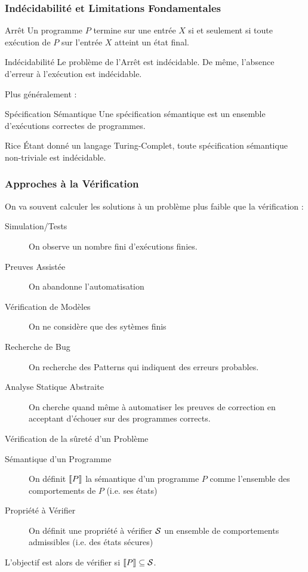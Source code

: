 \documentclass{cours}
\begin{document}
\subsubsection{Indécidabilité et Limitations Fondamentales}
\begin{définition}{Arrêt}{}
    Un programme $P$ termine sur une entrée $X$ si et seulement si toute exécution de $P$ sur l'entrée $X$ atteint un état final.
\end{définition}
\begin{théorème}{Indécidabilité}{}
    Le problème de l'Arrêt est indécidable. De même, l'absence d'erreur à l'exécution est indécidable.
\end{théorème}
Plus généralement : 
\begin{définition}{Spécification Sémantique}{}
    Une spécification sémantique est un ensemble d'exécutions correctes de programmes.
\end{définition}
\begin{théorème}{Rice}{}
    Étant donné un langage Turing-Complet, toute spécification sémantique non-triviale est indécidable.
\end{théorème}

\subsubsection{Approches à la Vérification}
On va souvent calculer les solutions à un problème plus faible que la vérification : 
\begin{description}
    \item[Simulation/Tests] On observe un nombre fini d'exécutions finies.
    \item[Preuves Assistée] On abandonne l'automatisation
    \item[Vérification de Modèles] On ne considère que des sytèmes finis
    \item[Recherche de Bug] On recherche des Patterns qui indiquent des erreurs probables.
    \item[Analyse Statique Abstraite] On cherche quand même à automatiser les preuves de correction en acceptant d'échouer sur des programmes corrects. 
\end{description}

\begin{définition}{Vérification de la sûreté d'un Problème}{}
    \begin{description}
        \item[Sémantique d'un Programme] On définit $\left\llbracket P \right\rrbracket$ la sémantique d'un programme $P$ comme l'ensemble des comportements de $P$ (i.e. ses états)
        \item[Propriété à Vérifier] On définit une propriété à vérifier $\mathcal{S}$ un ensemble de comportements admissibles (i.e. des états sécures)  
    \end{description}
    L'objectif est alors de vérifier si $\left\llbracket P \right\rrbracket \subseteq \mathcal{S}$.
\end{définition}
\end{document}
